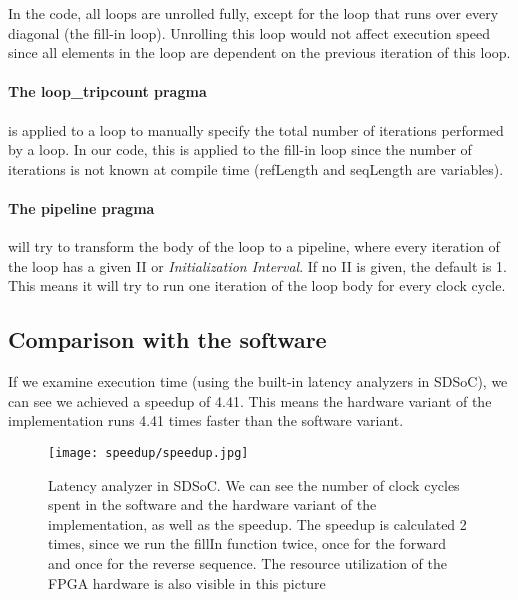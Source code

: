 In the code, all loops are unrolled fully, except for the loop that runs over every diagonal (the fill-in loop). Unrolling this loop would not affect execution speed since all elements in the loop are dependent on the previous iteration of this loop.

\paragraph{The loop\_tripcount pragma} is applied to a loop to manually specify the total number of iterations performed by a loop. In our code, this is applied to the fill-in loop since the number of iterations is not known at compile time (refLength and seqLength are variables).

\paragraph{The pipeline pragma} will try to transform the body of the loop to a pipeline, where every iteration of the loop has a given II or \emph{Initialization Interval}. If no II is given, the default is 1. This means it will try to run one iteration of the loop body for every clock cycle. 

\subsection{Comparison with the software}

If we examine execution time (using the built-in latency analyzers in SDSoC), we can see we achieved a speedup of 4.41. This means the hardware variant of the implementation runs 4.41 times faster than the software variant.

\begin{figure}[H]
	\centering
	\texttt{[image: speedup/speedup.jpg]}
	\caption{Latency analyzer in SDSoC. We can see the number of clock cycles spent in the software and the hardware variant of the implementation, as well as the speedup. The speedup is calculated 2 times, since we run the fillIn function twice, once for the forward and once for the reverse sequence. The resource utilization of the FPGA hardware is also visible in this picture}
	\label{fig:speedup}
\end{figure}